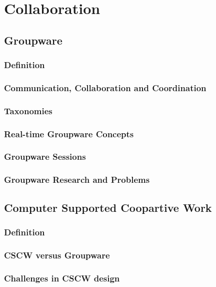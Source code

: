 \chapter{Collaboration}

\section{Groupware}

\subsection{Definition}

\subsection{Communication, Collaboration and Coordination}

\subsection{Taxonomies}

\subsection{Real-time Groupware Concepts}

\subsection{Groupware Sessions}

\subsection{Groupware Research and Problems}

\section{Computer Supported Coopartive Work}

\subsection{Definition}

\subsection{CSCW versus Groupware}

\subsection{Challenges in CSCW design}

